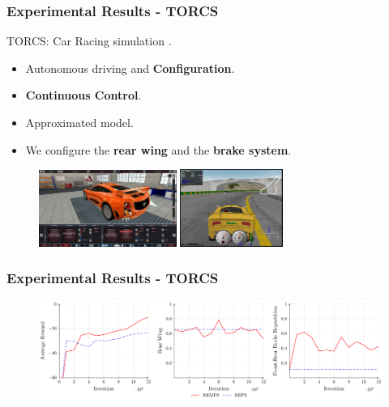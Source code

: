 \documentclass[english,aspectratio=1610]{beamer}
\theoremstyle{mystyle}
\theoremstyle{mystyle}
\theoremstyle{mystyle}
\begin{document}
\begin{frame}
	\frametitle{Experimental Results - TORCS}
	TORCS: Car Racing simulation \citep{TORCS, torcs-1}. \newline
	\vspace{-0.5cm}
	\begin{itemize}
		\item Autonomous driving and \textbf{Configuration}.
		\item \textbf{Continuous Control}.
		\item Approximated model.
		\item We configure the \textbf{rear wing} and the \textbf{brake system}.
	\end{itemize}
	\begin{figure}
	\includegraphics[width=0.4\textwidth]{pictures/car-conf}
	\hspace{1cm}
		\includegraphics[width=0.3\textwidth]{pictures/torcs_image}
	\end{figure}
\end{frame}

\begin{frame}
	\frametitle{Experimental Results - TORCS}
	\begin{figure}
		\includegraphics[width=1\textwidth]{plots/torcs/plot_torcs}
	\end{figure}
\end{frame}
\end{document}
